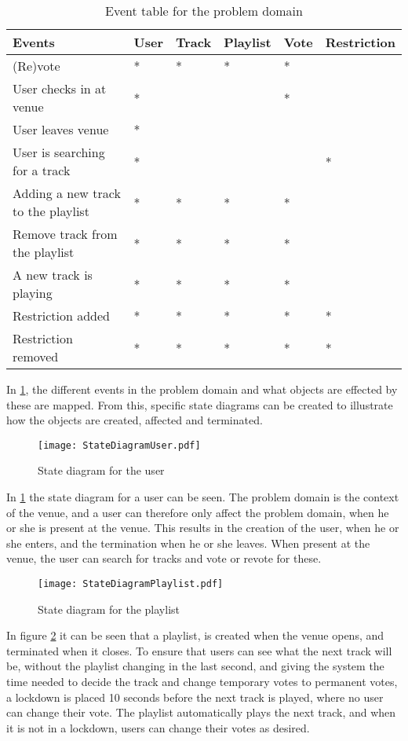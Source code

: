 \begin{table}
    \begin{tabular}{|l|l|l|l|l|l|}
		\centering
    \textbf{Events} & User & Track & Playlist & Vote & Restriction \\ \hline
    (Re)vote & * & * & * & * &   \\ \hline
    User checks in at venue & * &   &   & * &   \\ \hline
    User leaves venue & * &   &   &   &   \\ \hline
    User is searching for a track & * &   &   &  & * \\ \hline
    Adding a new track to the playlist & * & * & * & * &   \\ \hline
    Remove track from the playlist & * & * & * & * &   \\ \hline
    A new track is playing & * & * & * & * &   \\ \hline
    Restriction added & * & * & * & * & * \\ \hline
    Restriction removed & * & * & * & * & * \\ \hline
    \end{tabular}
		\caption{Event table for the problem domain}
		\label{eventtable}
\end{table}

In \cref{eventtable}, the different events in the problem domain and what objects are effected by these are mapped. From this, specific state diagrams can be created to illustrate how the objects are created, affected and terminated.

\begin{figure}[H]
  \centering
  \texttt{[image: StateDiagramUser.pdf]}
  \caption{State diagram for the user}\label{fig:StateDiagramUser}
\end{figure}
In \cref{fig:StateDiagramUser} the state diagram for a user can be seen. The problem domain is the context of the venue, and a user can therefore only affect the problem domain, when he or she is present at the venue. This results in the creation of the user, when he or she enters, and the termination when he or she leaves. When present at the venue, the user can search for tracks and vote or revote for these.

\begin{figure}[H]
  \centering
  \texttt{[image: StateDiagramPlaylist.pdf]}
  \caption{State diagram for the playlist}\label{fig:StateDiagramPlaylist}
\end{figure}
In figure \cref{fig:StateDiagramPlaylist} it can be seen that a playlist, is created when the venue opens, and terminated when it closes. To ensure that users can see what the next track will be, without the playlist changing in the last second, and giving the system the time needed to decide the track and change temporary votes to permanent votes, a lockdown is placed 10 seconds before the next track is played, where no user can change their vote. The playlist automatically plays the next track, and when it is not in a lockdown, users can change their votes as desired.

